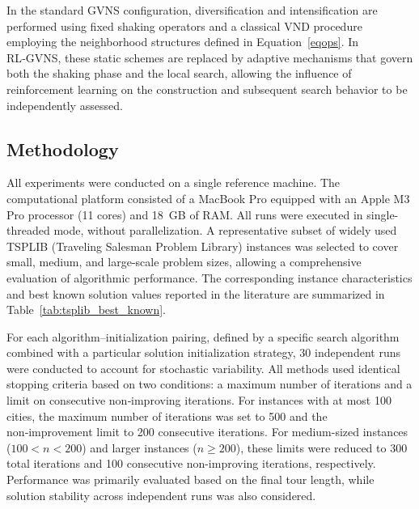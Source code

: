\documentclass[runningheads]{llncs}
\begin{document}
In the standard GVNS configuration, diversification and intensification are performed using fixed shaking operators and a classical VND procedure employing the neighborhood structures defined in Equation~\ref{eqops}. 
In RL‑GVNS, these static schemes are replaced by adaptive mechanisms that govern both the shaking phase and the local search, allowing the influence of reinforcement learning on the construction and subsequent search behavior to be independently assessed.

\subsection{Methodology}

All experiments were conducted on a single reference machine. The computational platform consisted of a MacBook Pro equipped with an Apple M3 Pro processor (11 cores) and 18~GB of RAM. All runs were executed in single-threaded mode, without parallelization. A representative subset of widely used TSPLIB (Traveling Salesman
Problem Library) instances was selected to cover small, medium, and large-scale problem sizes, allowing a comprehensive evaluation of algorithmic performance. The corresponding instance characteristics and best known solution values reported in the literature are summarized in Table~\ref{tab:tsplib_best_known}.

For each algorithm–initialization pairing, defined by a specific search algorithm combined with a particular solution initialization strategy, 30 independent runs were conducted to account for stochastic variability. All methods used identical stopping criteria based on two conditions: a maximum number of iterations and a limit on consecutive non‑improving iterations. For instances with at most 100 cities, the maximum number of iterations was set to 500 and the non‑improvement limit to 200 consecutive iterations. For medium-sized instances ($100 < n < 200$) and larger instances ($n \geq 200$), these limits were reduced to 300 total iterations and 100 consecutive non-improving iterations, respectively. Performance was primarily evaluated based on the final tour length, while solution stability across independent runs was also considered.
\end{document}
